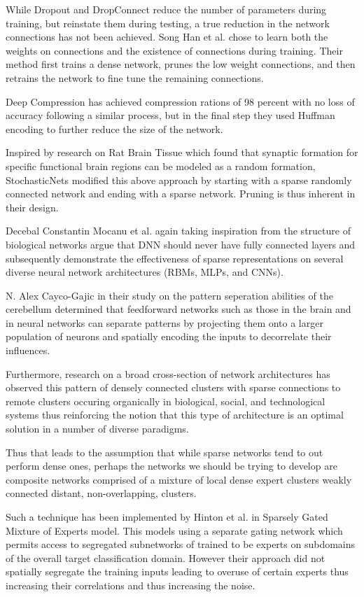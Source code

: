 \documentclass{llncs}
\begin{document}
While Dropout and DropConnect reduce the number of parameters during training, but reinstate them during testing, a true reduction in the network connections has not been achieved.   Song Han et al. chose to learn both the weights on connections and the existence of connections during training. Their method first trains a dense network, prunes the low weight connections, and then retrains the network to fine tune the remaining connections.

Deep Compression has achieved compression rations of 98 percent with no loss of accuracy following a similar process, but in the final step they used Huffman encoding to further reduce the size of the network.

Inspired by research on Rat Brain Tissue which found that synaptic formation for specific functional brain regions can be modeled as a random formation, StochasticNets modified this above approach by starting with a sparse randomly connected network and ending with a sparse network. Pruning is thus inherent in their design.

Decebal Constantin Mocanu et al. again taking inspiration from the structure of biological networks argue that DNN should never have fully connected layers and subsequently demonstrate the effectiveness of sparse representations on several diverse neural network architectures (RBMs, MLPs, and CNNs).

N. Alex Cayco-Gajic in their study on the pattern seperation abilities of the cerebellum determined that feedforward networks such as those in the brain and in neural networks can separate patterns by projecting them onto a larger population of neurons and spatially encoding the inputs to decorrelate their influences.

Furthermore, research on a broad cross-section of network architectures has observed this pattern of densely connected clusters with sparse connections to remote clusters occuring organically in biological, social, and technological systems thus reinforcing the notion that this type of architecture is an optimal solution in a number of diverse paradigms.

Thus that leads to the assumption that while sparse networks tend to out perform dense ones, perhaps the networks we should be trying to develop are composite networks comprised of a mixture of local dense expert clusters weakly connected distant, non-overlapping, clusters.

Such a technique has been implemented by Hinton et al. in Sparsely Gated Mixture of Experts model.  This models using a separate gating network which permits access to segregated subnetworks of trained to be experts on subdomains of the overall target classification domain.  However their approach did not spatially segregate the training inputs leading to overuse of certain experts thus increasing their correlations and thus increasing the noise.
\end{document}
